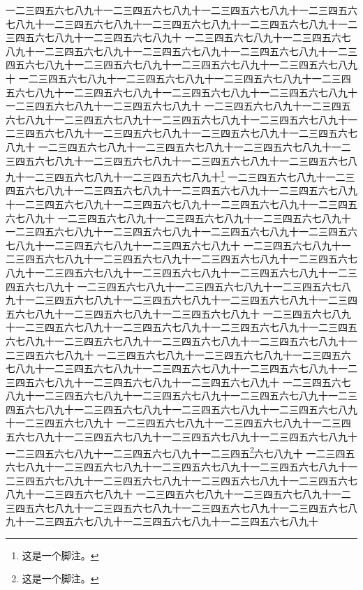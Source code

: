 \documentclass{scipub}
\begin{document}
一二三四五六七八九十一二三四五六七八九十一二三四五六七八九十一二三四五六七八九十一二三四五六七八九十一二三四五六七八九十一二三四五六七八九十一二三四五六七八九十一二三四五六七八九十
一二三四五六七八九十一二三四五六七八九十一二三四五六七八九十一二三四五六七八九十一二三四五六七八九十一二三四五六七八九十一二三四五六七八九十一二三四五六七八九十一二三四五六七八九十
一二三四五六七八九十一二三四五六七八九十一二三四五六七八九十一二三四五六七八九十一二三四五六七八九十一二三四五六七八九十一二三四五六七八九十一二三四五六七八九十一二三四五六七八九十
一二三四五六七八九十一二三四五六七八九十一二三四五六七八九十一二三四五六七八九十一二三四五六七八九十一二三四五六七八九十一二三四五六七八九十一二三四五六七八九十一二三四五六七八九十
一二三四五六七八九十一二三四五六七八九十一二三四五六七八九十一二三四五六七八九十一二三四五六七八九十一二三四五六七八九十一二三四五六七八九十一二三四五六七八九十一二三四五六七八九十\footnote{这是一个脚注。}
一二三四五六七八九十一二三四五六七八九十一二三四五六七八九十一二三四五六七八九十一二三四五六七八九十一二三四五六七八九十一二三四五六七八九十一二三四五六七八九十一二三四五六七八九十
一二三四五六七八九十一二三四五六七八九十一二三四五六七八九十一二三四五六七八九十一二三四五六七八九十一二三四五六七八九十一二三四五六七八九十一二三四五六七八九十一二三四五六七八九十
一二三四五六七八九十一二三四五六七八九十一二三四五六七八九十一二三四五六七八九十一二三四五六七八九十一二三四五六七八九十一二三四五六七八九十一二三四五六七八九十一二三四五六七八九十
一二三四五六七八九十一二三四五六七八九十一二三四五六七八九十一二三四五六七八九十一二三四五六七八九十一二三四五六七八九十一二三四五六七八九十一二三四五六七八九十一二三四五六七八九十
一二三四五六七八九十一二三四五六七八九十一二三四五六七八九十一二三四五六七八九十一二三四五六七八九十一二三四五六七八九十一二三四五六七八九十一二三四五六七八九十一二三四五六七八九十
一二三四五六七八九十一二三四五六七八九十一二三四五六七八九十一二三四五六七八九十一二三四五六七八九十一二三四五六七八九十一二三四五六七八九十一二三四五六七八九十一二三四五六七八九十
一二三四五六七八九十一二三四五六七八九十一二三四五六七八九十一二三四五六七八九十一二三四五六七八九十一二三四五六七八九十一二三四五六七八九十一二三四五六七八九十一二三四五六七八九十
一二三四五六七八九十一二三四五六七八九十一二三四五六七八九十一二三四五六七八九十一二三四五六七八九十一二三四五六七八九十一二三四五六七八九十一二三四五六七八九十一二三四五\footnote{这是一个脚注。}六七八九十
一二三四五六七八九十一二三四五六七八九十一二三四五六七八九十一二三四五六七八九十一二三四五六七八九十一二三四五六七八九十一二三四五六七八九十一二三四五六七八九十一二三四五六七八九十
一二三四五六七八九十一二三四五六七八九十一二三四五六七八九十一二三四五六七八九十一二三四五六七八九十一二三四五六七八九十一二三四五六七八九十一二三四五六七八九十一二三四五六七八九十
\end{document}
